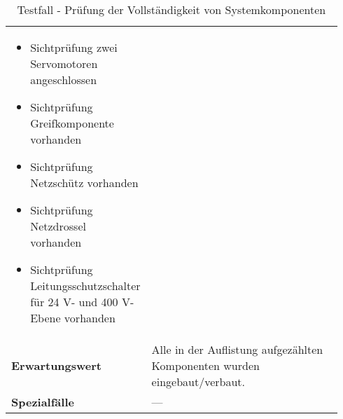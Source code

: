 \documentclass[../../../Bachelorarbeit.tex]{subfiles}
\begin{document}
\begin{table}[H]
\begin{tabular}{ p{0.34\linewidth}  p{0.6\linewidth} }
{\begin{itemize}[noitemsep,topsep=0pt,parsep=0pt,partopsep=0pt,leftmargin=*]
                                                \item Sichtprüfung zwei Servomotoren angeschlossen
                                                \item Sichtprüfung Greifkomponente vorhanden
                                                \item Sichtprüfung Netzschütz vorhanden
                                                \item Sichtprüfung Netzdrossel vorhanden
                                                \item Sichtprüfung Leitungsschutzschalter für 24 \si{V}- und 400 \si{V}-Ebene vorhanden
                                            \end{itemize}} \\
        \textbf{Erwartungswert}         & Alle in der Auflistung aufgezählten Komponenten wurden eingebaut/verbaut. \\
        \textbf{Spezialfälle}           & --- \\ \hline
    \end{tabular}
    \caption[\acs{tf} - Vollständigkeitsprüfung]{Testfall - Prüfung der Vollständigkeit von Systemkomponenten}
    \label{tab:my-table60}
\end{table}
\end{document}
